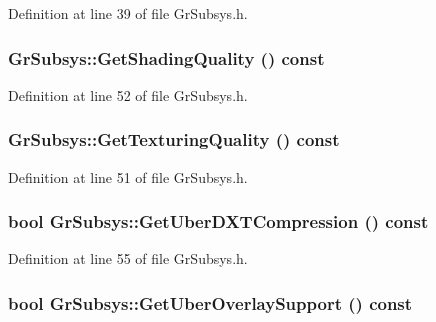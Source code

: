 Definition at line 39 of file GrSubsys.h.\hypertarget{class_gr_subsys_66edbd30a3f1d39b73eb00df33f89404}{
\subsubsection[{GetShadingQuality}]{ GrSubsys::GetShadingQuality () const}}
\label{class_gr_subsys_66edbd30a3f1d39b73eb00df33f89404}




Definition at line 52 of file GrSubsys.h.\hypertarget{class_gr_subsys_45b6a0acd149993f18e157414788ed8d}{
\subsubsection[{GetTexturingQuality}]{ GrSubsys::GetTexturingQuality () const}}
\label{class_gr_subsys_45b6a0acd149993f18e157414788ed8d}




Definition at line 51 of file GrSubsys.h.\hypertarget{class_gr_subsys_8550cea92945ba8f93d6fdbdaf6ee6bf}{
\subsubsection[{GetUberDXTCompression}]{\setlength{\rightskip}{0pt plus 5cm}bool GrSubsys::GetUberDXTCompression () const}}
\label{class_gr_subsys_8550cea92945ba8f93d6fdbdaf6ee6bf}




Definition at line 55 of file GrSubsys.h.\hypertarget{class_gr_subsys_3cfcbb972dde87822c868363146bf7ee}{
\subsubsection[{GetUberOverlaySupport}]{\setlength{\rightskip}{0pt plus 5cm}bool GrSubsys::GetUberOverlaySupport () const}}
\label{class_gr_subsys_3cfcbb972dde87822c868363146bf7ee}





